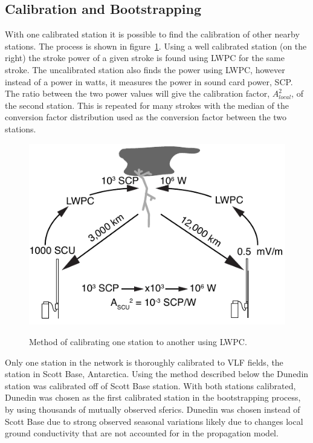 \subsection{Calibration and Bootstrapping}

With one calibrated station it is possible to find the calibration of other nearby stations.
The process is shown in figure~\ref{energy:fig:calibrate}.
Using a well calibrated station (on the right) the stroke power of a given stroke is found using LWPC for the same stroke.
The uncalibrated station also finds the power using LWPC, however instead of a power in watts, it measures the power in sound card power, SCP.
The ratio between the two power values will give the calibration factor, $A_{local}^2$, of the second station.
This is repeated for many strokes with the median of the conversion factor distribution used as the conversion factor between the two stations.

\begin{figure}[ht!]
\centering
\includegraphics[scale=1]{energy/Figures/PPS_Method.pdf}\\
\caption{Method of calibrating one station to another using LWPC.}
\label{energy:fig:calibrate}
\end{figure}

Only one station in the network is thoroughly calibrated to VLF fields, the station in Scott Base, Antarctica.
Using the method described below the Dunedin station was calibrated off of Scott Base station.
With both stations calibrated, Dunedin was chosen as the first calibrated station in the bootstrapping process, by using thousands of mutually observed sferics.
Dunedin was chosen instead of Scott Base due to strong observed seasonal variations likely due to changes local ground conductivity that are not accounted for in the propagation model.

